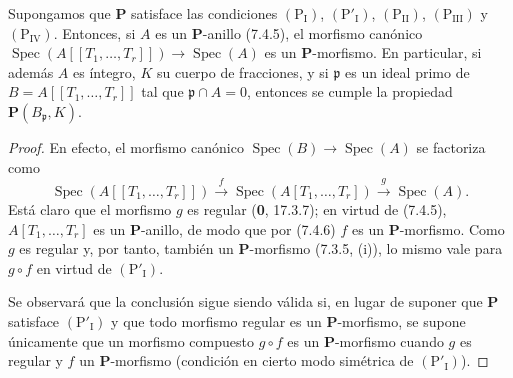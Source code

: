 \begin{corollary}[7.4.7]
\label{IV.2.s7.4.7-fr}
Supongamos que $\boldsymbol P$ satisface las condiciones
$(\mathrm P_{\mathrm I})$, $(\mathrm P'_{\mathrm I})$,
$(\mathrm P_{\mathrm{II}})$, $(\mathrm P_{\mathrm{III}})$ y
$(\mathrm P_{\mathrm{IV}})$. Entonces, si $A$ es un
$\boldsymbol P$-anillo (7.4.5), el morfismo canónico
$\operatorname{Spec}(A[[T_1,\ldots,T_r]])\to\operatorname{Spec}(A)$ es un
$\boldsymbol P$-morfismo. En particular, si además $A$ es íntegro, $K$
su cuerpo de fracciones, y si $\mathfrak p$ es un ideal primo de
$B=A[[T_1,\ldots,T_r]]$ tal que $\mathfrak p\cap A=0$, entonces se
cumple la propiedad $\boldsymbol P(B_{\mathfrak p},K)$.
\end{corollary}

\begin{proof}
En efecto, el morfismo canónico
$\operatorname{Spec}(B)\to\operatorname{Spec}(A)$ se factoriza como
\[
\operatorname{Spec}(A[[T_1,\ldots,T_r]])
\xrightarrow{f}\operatorname{Spec}(A[T_1,\ldots,T_r])
\xrightarrow{g}\operatorname{Spec}(A).
\]
Está claro que el morfismo $g$ es regular (\textbf 0, 17.3.7); en virtud de
(7.4.5), $A[T_1,\ldots,T_r]$ es un $\boldsymbol P$-anillo, de modo que
por (7.4.6) $f$ es un $\boldsymbol P$-morfismo. Como $g$ es regular y,
por tanto, también un $\boldsymbol P$-morfismo (7.3.5, (i)), lo mismo
vale para $g\circ f$ en virtud de $(\mathrm P'_{\mathrm I})$.

Se observará que la conclusión sigue siendo válida si, en lugar de suponer
que $\boldsymbol P$ satisface $(\mathrm P'_{\mathrm I})$ y que todo
morfismo regular es un $\boldsymbol P$-morfismo, se supone únicamente
que un morfismo compuesto $g\circ f$ es un $\boldsymbol P$-morfismo
cuando $g$ es regular y $f$ un $\boldsymbol P$-morfismo (condición en
cierto modo simétrica de $(\mathrm P'_{\mathrm I})$).
\end{proof}
